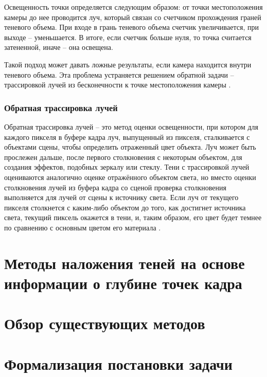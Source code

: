 Освещенность точки определяется следующим образом: от точки местоположения камеры до нее проводится луч, который связан со счетчиком прохождения граней теневого объема. При входе в грань теневого объема счетчик увеличивается, при выходе -- уменьшается. В итоге, если счетчик больше нуля, то точка считается затененной, иначе -- она освещена.

Такой подход может давать ложные результаты, если камера находится внутри теневого объема. Эта проблема устраняется решением обратной задачи -- трассировкой лучей из бесконечности к точке местоположения камеры \cite{shad_vol}.

\subsubsection*{Обратная трассировка лучей}

Обратная трассировка лучей -- это метод оценки освещенности, при котором для каждого пикселя в буфере кадра луч, выпущенный из пикселя, сталкивается с объектами сцены, чтобы определить отраженный цвет объекта. Луч может быть прослежен дальше, после первого столкновения с некоторым объектом, для создания эффектов, подобных зеркалу или стеклу. Тени с трассировкой лучей оцениваются аналогично оценке отражённого объектом света, но вместо оценки столкновения лучей из буфера кадра со сценой проверка столкновения выполняется для лучей от сцены к источнику света. Если луч от текущего пикселя столкнется с каким-либо объектом до того, как достигнет источника света, текущий пиксель окажется в тени, и, таким образом, его цвет будет темнее по сравнению с основным цветом его материала \cite{engel2008programming}.

\section{Методы наложения теней на основе информации о глубине точек кадра}



\section{Обзор существующих методов}



\section{Формализация постановки задачи}

